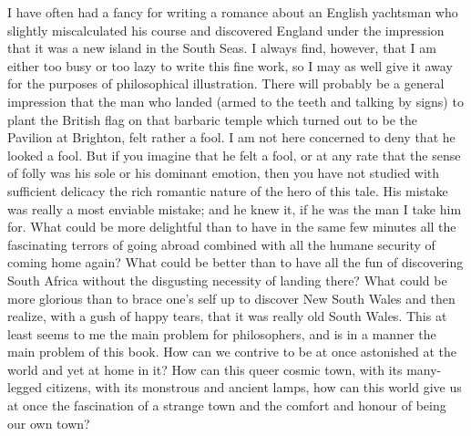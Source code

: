 I have often had a fancy for writing a romance about an English yachtsman who slightly miscalculated his course and discovered England under the impression that it was a new island in the South Seas. I always find, however, that I am either too busy or too lazy to write this fine work, so I may as well give it away for the purposes of philosophical illustration. There will probably be a general impression that the man who landed (armed to the teeth and talking by signs) to plant the British flag on that barbaric temple which turned out to be the Pavilion at Brighton, felt rather a fool. I am not here concerned to deny that he looked a fool. But if you imagine that he felt a fool, or at any rate that the sense of folly was his sole or his dominant emotion, then you have not studied with sufficient delicacy the rich romantic nature of the hero of this tale. His mistake was really a most enviable mistake; and he knew it, if he was the man I take him for. What could be more delightful than to have in the same few minutes all the fascinating terrors of going abroad combined with all the humane security of coming home again? What could be better than to have all the fun of discovering South Africa without the disgusting necessity of landing there? What could be more glorious than to brace one’s self up to discover New South Wales and then realize, with a gush of happy tears, that it was really old South Wales. This at least seems to me the main problem for philosophers, and is in a manner the main problem of this book. How can we contrive to be at once astonished at the world and yet at home in it? How can this queer cosmic town, with its many-legged citizens, with its monstrous and ancient lamps, how can this world give us at once the fascination of a strange town and the comfort and honour of being our own town?

